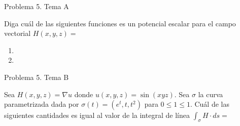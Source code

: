 \documentclass[usepdftitle=false]{beamer}
\begin{document}
\begin{frame}{Problema 5. Tema A}

Diga cu\'al de las siguientes funciones es un potencial escalar para el campo vectorial $H(x,y,z)=$

\begin{enumerate}
\item 
\item
\end{enumerate}

\end{frame}


\begin{frame}{Problema 5. Tema B}

Sea $H(x,y,z)=\nabla u$ donde $u(x,y,z)=\sin(xyz)$. Sea $\sigma$ la curva parametrizada dada por $\sigma(t)=(e^t,t,t^2)$ para $0\leq 1\leq 1$. Cu\'al de las siguientes cantidades es igual al valor de la integral de l\'inea
$\int_{\sigma} H\cdot ds=$


\end{frame}
\end{document}
